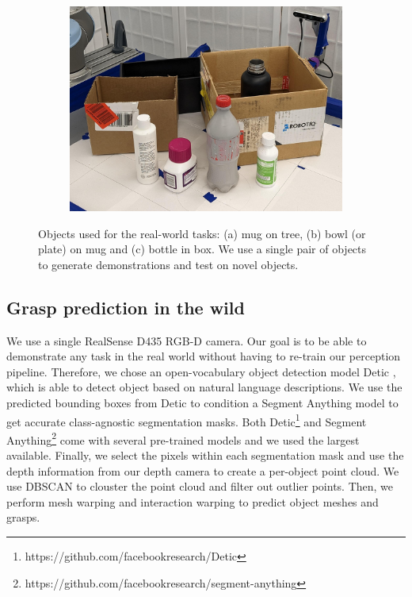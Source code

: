\documentclass{article}
\begin{document}
\begin{figure}[]
\begin{subfigure}{(\linewidth - 0.05\linewidth)/3}
        \centering
        \includegraphics[width=\linewidth]{figures/object_sets/bottle_in_box.png}
        \caption{}
    \end{subfigure}

    \caption{Objects used for the real-world tasks: (a) mug on tree, (b) bowl (or plate) on mug and (c) bottle in box. We use a single pair of objects to generate demonstrations and test on novel objects.}
    \label{fig:object_sets}
\end{figure}

\subsection{Grasp prediction in the wild}
\label{appendix:experiment:wild}

We use a single RealSense D435 RGB-D camera. Our goal is to be able to demonstrate any task in the real world without having to re-train our perception pipeline. Therefore, we chose an open-vocabulary object detection model Detic \cite{zhou22detecting}, which is able to detect object based on natural language descriptions. We use the predicted bounding boxes from Detic to condition a Segment Anything model \cite{kirillov23segment} to get accurate class-agnostic segmentation masks. Both Detic\footnote{https://github.com/facebookresearch/Detic} and Segment Anything\footnote{https://github.com/facebookresearch/segment-anything} come with several pre-trained models and we used the largest available. Finally, we select the pixels within each segmentation mask and use the depth information from our depth camera to create a per-object point cloud. We use DBSCAN to clouster the point cloud and filter out outlier points. Then, we perform mesh warping and interaction warping to predict object meshes and grasps.
\end{document}
